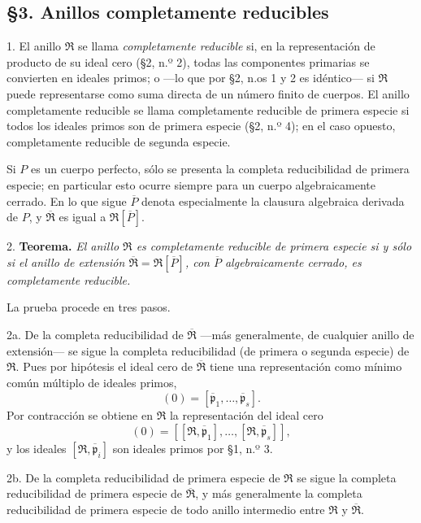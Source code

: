 \documentclass[11pt]{article}
\providecommand{\mR}{\mathfrak{R}}
\providecommand{\bR}{\overline{\mathfrak{R}}}
\providecommand{\bP}{\overline{P}}
\providecommand{\bp}{\overline{\mathfrak{p}}}
\begin{document}
\subsection*{\S 3. Anillos completamente reducibles}

1. El anillo $\mR$ se llama \emph{completamente reducible} si, en la representación de producto de su ideal cero (\S 2, n.º 2), todas las componentes primarias se convierten en ideales primos; o ---lo que por \S 2, n.os 1 y 2 es idéntico--- si $\mR$ puede representarse como suma directa de un número finito de cuerpos. El anillo completamente reducible se llama completamente reducible de primera especie si todos los ideales primos son de primera especie (\S 2, n.º 4); en el caso opuesto, completamente reducible de segunda especie.

Si $P$ es un cuerpo perfecto, sólo se presenta la completa reducibilidad de primera especie; en particular esto ocurre siempre para un cuerpo algebraicamente cerrado. En lo que sigue $\bP$ denota especialmente la clausura algebraica derivada de $P$, y $\bR$ es igual a $\mR[\bP]$.

2. \textbf{Teorema.} \emph{El anillo $\mR$ es completamente reducible de primera especie si y sólo si el anillo de extensión $\bR=\mR[\bP]$, con $\bP$ algebraicamente cerrado, es completamente reducible.}

La prueba procede en tres pasos.

2a. De la completa reducibilidad de $\bR$ ---más generalmente, de cualquier anillo de extensión--- se sigue la completa reducibilidad (de primera o segunda especie) de $\mR$. Pues por hipótesis el ideal cero de $\bR$ tiene una representación como mínimo común múltiplo de ideales primos,
\[
        (0)=[\bp_1,\ldots,\bp_s].
\]
Por contracción se obtiene en $\mR$ la representación del ideal cero
\[
        (0)=[[\mR,\bp_1],\ldots,[\mR,\bp_s]],
\]
y los ideales $[\mR,\bp_i]$ son ideales primos por \S 1, n.º 3.

2b. De la completa reducibilidad de primera especie de $\mR$ se sigue la completa reducibilidad de primera especie de $\bR$, y más generalmente la completa reducibilidad de primera especie de todo anillo intermedio entre $\mR$ y $\bR$.
\end{document}
